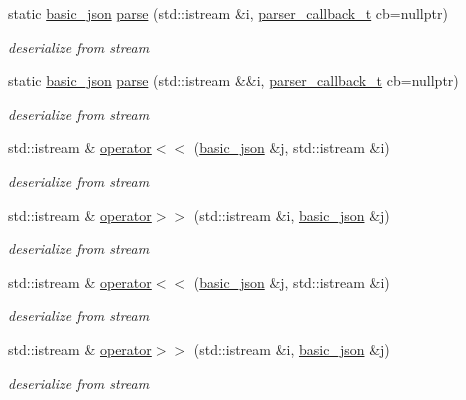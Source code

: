 \begin{DoxyCompactItemize}
static \hyperlink{classnlohmann_1_1basic__json}{basic\-\_\-json} \hyperlink{classnlohmann_1_1basic__json_a13c4d2ab4e7ee2f92be785a7b12948ff}{parse} (std\-::istream \&i, \hyperlink{classnlohmann_1_1basic__json_a9e35475e2027520a78e09f460dbe048a}{parser\-\_\-callback\-\_\-t} cb=nullptr)
\begin{DoxyCompactList}\small\item\em deserialize from stream \end{DoxyCompactList}\item 
static \hyperlink{classnlohmann_1_1basic__json}{basic\-\_\-json} \hyperlink{classnlohmann_1_1basic__json_ab81f2801779e6cb9d98770860af2e39a}{parse} (std\-::istream \&\&i, \hyperlink{classnlohmann_1_1basic__json_a9e35475e2027520a78e09f460dbe048a}{parser\-\_\-callback\-\_\-t} cb=nullptr)
\begin{DoxyCompactList}\small\item\em deserialize from stream \end{DoxyCompactList}\item 
std\-::istream \& \hyperlink{classnlohmann_1_1basic__json_a60ca396028b8d9714c6e10efbf475af6}{operator$<$$<$} (\hyperlink{classnlohmann_1_1basic__json}{basic\-\_\-json} \&j, std\-::istream \&i)
\begin{DoxyCompactList}\small\item\em deserialize from stream \end{DoxyCompactList}\item 
std\-::istream \& \hyperlink{classnlohmann_1_1basic__json_aaf363408931d76472ded14017e59c9e8}{operator$>$$>$} (std\-::istream \&i, \hyperlink{classnlohmann_1_1basic__json}{basic\-\_\-json} \&j)
\begin{DoxyCompactList}\small\item\em deserialize from stream \end{DoxyCompactList}\item 
std\-::istream \& \hyperlink{classnlohmann_1_1basic__json_a60ca396028b8d9714c6e10efbf475af6}{operator$<$$<$} (\hyperlink{classnlohmann_1_1basic__json}{basic\-\_\-json} \&j, std\-::istream \&i)
\begin{DoxyCompactList}\small\item\em deserialize from stream \end{DoxyCompactList}\item 
std\-::istream \& \hyperlink{classnlohmann_1_1basic__json_aaf363408931d76472ded14017e59c9e8}{operator$>$$>$} (std\-::istream \&i, \hyperlink{classnlohmann_1_1basic__json}{basic\-\_\-json} \&j)
\begin{DoxyCompactList}\small\item\em deserialize from stream \end{DoxyCompactList}\end{DoxyCompactItemize}

